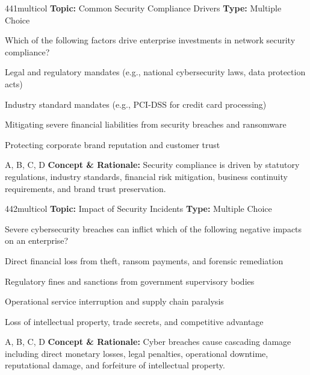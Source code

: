 \begin{qcard}{441}{multicol}
\textcolor{darkslate!75}{\small\textbf{Topic:} Common Security Compliance Drivers \hfill \textbf{Type:} Multiple Choice}\vspace{0.4em}\par
Which of the following factors drive enterprise investments in network security compliance?
\begin{qoptions}
\item Legal and regulatory mandates (e.g., national cybersecurity laws, data protection acts)
\item Industry standard mandates (e.g., PCI-DSS for credit card processing)
\item Mitigating severe financial liabilities from security breaches and ransomware
\item Protecting corporate brand reputation and customer trust
\end{qoptions}
\end{qcard}
\nopagebreak
\begin{explainbox}{A, B, C, D}
\textbf{Concept \& Rationale:} Security compliance is driven by statutory regulations, industry standards, financial risk mitigation, business continuity requirements, and brand trust preservation.
\end{explainbox}

\begin{qcard}{442}{multicol}
\textcolor{darkslate!75}{\small\textbf{Topic:} Impact of Security Incidents \hfill \textbf{Type:} Multiple Choice}\vspace{0.4em}\par
Severe cybersecurity breaches can inflict which of the following negative impacts on an enterprise?
\begin{qoptions}
\item Direct financial loss from theft, ransom payments, and forensic remediation
\item Regulatory fines and sanctions from government supervisory bodies
\item Operational service interruption and supply chain paralysis
\item Loss of intellectual property, trade secrets, and competitive advantage
\end{qoptions}
\end{qcard}
\nopagebreak
\begin{explainbox}{A, B, C, D}
\textbf{Concept \& Rationale:} Cyber breaches cause cascading damage including direct monetary losses, legal penalties, operational downtime, reputational damage, and forfeiture of intellectual property.
\end{explainbox}

